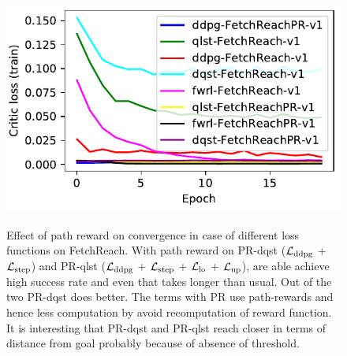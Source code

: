 \begin{figure}
  \includegraphics[width=\frac\columnwidth]{media/res/245b3c4-ce781a70-FetchReachPR-v1-fwrl-future-her_fwrl_path_reward/train/critic_loss.pdf}%
  \label{fig:}%
  \caption{Effect of path reward on convergence in case of different loss
    functions on FetchReach. With path reward on PR-dqst
    ($\mathcal{L}_{\text{ddpg}}$ + $\mathcal{L}_{\text{step}}$)
    and PR-qlst
    ($\mathcal{L}_{\text{ddpg}}$ + $\mathcal{L}_{\text{step}}$ + $\mathcal{L}_{\text{lo}}$ + $\mathcal{L}_{\text{up}}$), are able achieve high
    success rate and even that takes longer than usual. Out of the two PR-dqst
    does better. The terms with PR use path-rewards and hence less computation
    by avoid recomputation of reward function. It is interesting that PR-dqst
    and PR-qlst reach closer in terms of distance from goal probably because of
    absence of threshold.}%
\end{figure}%
% 

